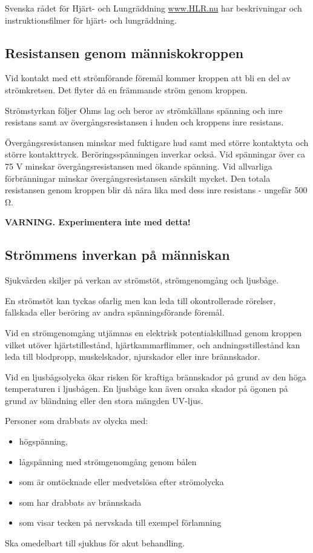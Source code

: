 Svenska rådet för Hjärt- och Lungräddning \url{www.HLR.nu} har beskrivningar
och instruktionsfilmer för hjärt- och lungräddning.

\subsection{Resistansen genom människokroppen}

Vid kontakt med ett strömförande föremål kommer kroppen att bli en del
av strömkretsen. Det flyter då en främmande ström genom kroppen.

Strömstyrkan följer Ohms lag och beror av strömkällans spänning och
inre resistans samt av övergångsresistansen i huden och kroppens inre
resistans.

Övergångsresistansen minskar med fuktigare hud samt med större
kontaktyta och större kontakttryck. Beröringsspänningen inverkar
också. Vid spänningar över ca 75 V minskar övergångsresistansen med
ökande spänning. Vid allvarliga förbränningar minskar
övergångsresistansen särskilt mycket.  Den totala resistansen genom
kroppen blir då nära lika med dess inre resistans - ungefär 500 Ω.

\textbf{VARNING. Experimentera inte med detta!}


\subsection{Strömmens inverkan på människan}

Sjukvården skiljer på verkan av strömstöt, strömgenomgång och ljusbåge.

En strömstöt kan tyckas ofarlig men kan leda till okontrollerade rörelser,
fallskada eller beröring av andra spänningsförande föremål.

Vid en strömgenomgång utjämnas en elektrisk potentialskillnad genom kroppen
vilket utöver hjärtstillestånd, hjärtkammarflimmer, och andningsstillestånd
kan leda till blodpropp, muskelskador, njurskador eller inre brännskador.

Vid en ljusbågsolycka ökar risken för kraftiga brännskador på grund av den
höga temperaturen i ljusbågen. En ljusbåge kan även orsaka skador på ögonen
på grund av bländning eller den stora mängden UV-ljus.

Personer som drabbats av olycka med:
\begin{itemize}
\item högspänning,
\item lågspänning med strömgenomgång genom bålen
\item som är omtöcknade eller medvetslösa efter strömolycka
\item som har drabbats av brännskada
\item som visar tecken på nervskada till exempel förlamning
\end{itemize}
Ska omedelbart till sjukhus för akut behandling.


